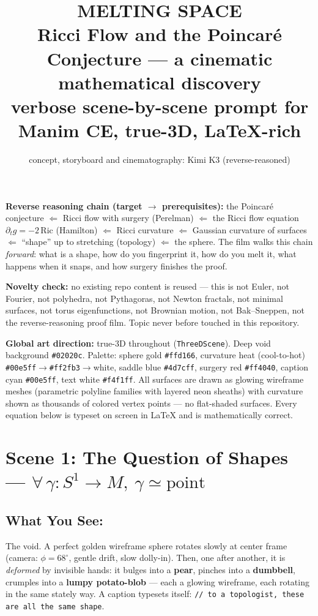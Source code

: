 \documentclass[11pt]{article}
\title{\textbf{MELTING SPACE}\\ \large Ricci Flow and the Poincar\'e Conjecture --- a cinematic mathematical discovery\\
\large verbose scene-by-scene prompt for Manim CE, true-3D, \LaTeX-rich}
\author{concept, storyboard and cinematography: Kimi K3 (reverse-reasoned)}
\date{}
\begin{document}
\maketitle

\noindent\textbf{Reverse reasoning chain (target $\to$ prerequisites):}
the Poincar\'e conjecture $\Leftarrow$ Ricci flow with surgery (Perelman)
$\Leftarrow$ the Ricci flow equation $\partial_t g = -2\,\mathrm{Ric}$ (Hamilton)
$\Leftarrow$ Ricci curvature $\Leftarrow$ Gaussian curvature of surfaces
$\Leftarrow$ ``shape'' up to stretching (topology) $\Leftarrow$ the sphere.
The film walks this chain \emph{forward}: what is a shape, how do you fingerprint it,
how do you melt it, what happens when it snaps, and how surgery finishes the proof.

\noindent\textbf{Novelty check:} no existing repo content is reused --- this is not
Euler, not Fourier, not polyhedra, not Pythagoras, not Newton fractals, not minimal
surfaces, not torus eigenfunctions, not Brownian motion, not Bak--Sneppen, not the
reverse-reasoning proof film. Topic never before touched in this repository.

\noindent\textbf{Global art direction:} true-3D throughout (\texttt{ThreeDScene}).
Deep void background \texttt{\#02020c}. Palette: sphere gold \texttt{\#ffd166},
curvature heat (cool-to-hot) \texttt{\#00e5ff}$\to$\texttt{\#ff2fb3}$\to$white,
saddle blue \texttt{\#4d7cff}, surgery red \texttt{\#ff4040}, caption cyan
\texttt{\#00e5ff}, text white \texttt{\#f4f1ff}. All surfaces are drawn as glowing
wireframe meshes (parametric polyline families with layered neon sheaths) with
curvature shown as thousands of colored vertex points --- no flat-shaded surfaces.
Every equation below is typeset on screen in \LaTeX{} and is mathematically correct.

\bigskip\hrulefill

\section*{Scene 1: The Question of Shapes --- \( \forall\,\gamma : S^1 \to M,\ \gamma \simeq \text{point} \)}

\subsection*{What You See:}

The void. A perfect golden wireframe sphere rotates slowly at center frame (camera:
$\phi = 68^\circ$, gentle drift, slow dolly-in). Then, one after another, it is
\emph{deformed} by invisible hands: it bulges into a \textbf{pear}, pinches into a
\textbf{dumbbell}, crumples into a \textbf{lumpy potato-blob} --- each a glowing
wireframe, each rotating in the same stately way. A caption typesets itself:
\texttt{// to a topologist, these are all the same shape}.
\end{document}
